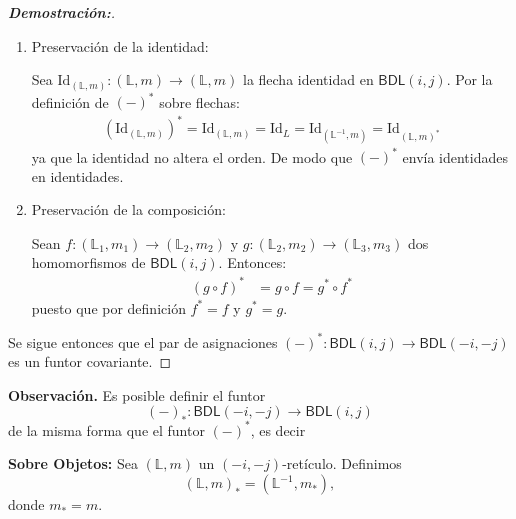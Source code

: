 \documentclass[12pt]{book}
\newcommand{\Id}{\mathrm{Id}}
\newcommand{\BDL}{\mathsf{BDL}}
\begin{document}
\begin{proof}[\textbf{Demostración:}]
\begin{enumerate}
Sean $(\mathbb{L}_1, m_1)$, $(\mathbb{L}_2, m_2)$ dos $(i,j)$-retículos y $ f: (\mathbb{L}_1, m_1) \to (\mathbb{L}_2, m_2)$ un homomorfismo de $(i,j)$-retículos. Es sencillo comprobar que $f^* \colon \mathbb{L}_1^{-1} \to \mathbb{L}_2^{-1}$ es un homomorfismo de retículos. Además, se sigue que
\begin{align*}
f^{*}(m^{*}(a)) & = f^{*}(m(a)) \\
                & = f(m(a)) \\
                & = m(f(a)) \\
                & = m^{*}(f^{*}(a))
\end{align*}
Entonces  $f^*$ es un homomorfismo de $(-i,-j)$-retículos. Por lo que la asignación $(-)^{*}$ sobre las flechas está bien definida.

\item Preservación de la identidad:  

Sea $\Id_{(\mathbb{L}, m)}\colon(\mathbb{L}, m)\to(\mathbb{L}, m)$ la flecha identidad en $\BDL(i,j)$. Por la definición de $(-)^*$ sobre flechas:
\begin{align*}
(\Id_{(\mathbb{L}, m)})^* = \Id_{(\mathbb{L}, m)}= \Id_{L}= \Id_{(\mathbb{L}^{-1},m)} = \Id_{(\mathbb{L},m)^*}
\end{align*}
ya que la identidad no altera el orden. De modo que $(-)^*$ envía identidades en identidades.

\medskip
\item Preservación de la composición:

Sean $f\colon(\mathbb{L}_1,m_1)\to(\mathbb{L}_2,m_2)$ y 
$g\colon(\mathbb{L}_2,m_2)\to(\mathbb{L}_3,m_3)$ dos homomorfismos de $\BDL(i,j)$. Entonces:
\begin{align*}
(g\circ f)^* &= g\circ f = g^*\circ f^*
\end{align*}
puesto que por definición $f^* = f$ y $g^* = g$.
\end{enumerate}
Se sigue entonces que el par de asignaciones $(-)^{*} \colon \BDL(i,j) \to \BDL(-i,-j)$ es un funtor covariante. 

\end{proof}
\smallskip

\noindent\textbf{Observación.} Es posible definir el funtor
\[
(-)_{*}\colon \BDL(-i,-j)\longrightarrow \BDL(i,j)
\]
de la misma forma que el funtor $(-)^{*}$, es decir

\noindent \textbf{Sobre Objetos:} Sea $(\mathbb{L},m)$ un $(-i,-j)$-retículo. Definimos
\[ \left( \mathbb{L},m \right)_{*} = \left(\mathbb{L}^{-1},m_{*}\right), \]
donde $m_{*} = m$.
\end{document}
